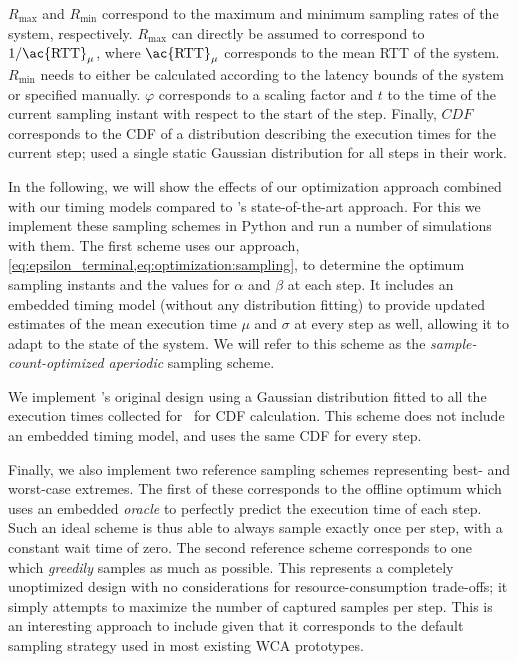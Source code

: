 \( R_\text{max} \) and \( R_\text{min} \) correspond to the maximum and minimum sampling rates of the system, respectively.
\( R_\text{max} \) can directly be assumed to correspond to \( 1 / \text{\ac{RTT}}_\mu \), where \( \text{\ac{RTT}}_\mu \) corresponds to the mean \ac{RTT} of the system.
\( R_\text{min} \) needs to either be calculated according to the latency bounds of the system or specified manually.
\( \varphi \) corresponds to a scaling factor and \( t \) to the time of the current sampling instant with respect to the start of the step.
Finally, \( CDF \) corresponds to the \ac{CDF} of a distribution describing the execution times for the current step; \citeauthor{Wang2019Towards} used a single static Gaussian distribution for all steps in their work.

\medskip

In the following, we will show the effects of our optimization approach combined with our timing models compared to \textcite{Wang2019Towards}'s state-of-the-art approach.
For this we implement these sampling schemes in Python and run a number of simulations with them.
The first scheme uses our approach, \cref{eq:epsilon_terminal,eq:optimization:sampling}, to determine the optimum sampling instants and the values for \( \alpha \) and \( \beta \) at each step.
It includes an embedded timing model (without any distribution fitting) to provide updated estimates of the mean execution time \( \mu \) and \( \sigma \) at every step as well, allowing it to adapt to the state of the system.
We will refer to this scheme as the \emph{sample-count-optimized aperiodic} sampling scheme.

We implement \citeauthor{Wang2019Towards}'s original design using a Gaussian distribution fitted to all the execution times collected for~\cite{olguinmunoz:impact2021} for \ac{CDF} calculation.
This scheme does not include an embedded timing model, and uses the same \ac{CDF} for every step.

Finally, we also implement two reference sampling schemes representing best- and worst-case extremes.
The first of these corresponds to the offline optimum which uses an embedded \emph{oracle} to perfectly predict the execution time of each step.
Such an ideal scheme is thus able to always sample exactly once per step, with a constant wait time of zero.
The second reference scheme corresponds to one which \emph{greedily} samples as much as possible.
This represents a completely unoptimized design with no considerations for resource-consumption trade-offs; it simply attempts to maximize the number of captured samples per step.
This is an interesting approach to include given that it corresponds to the default sampling strategy used in most existing \ac{WCA} prototypes.

